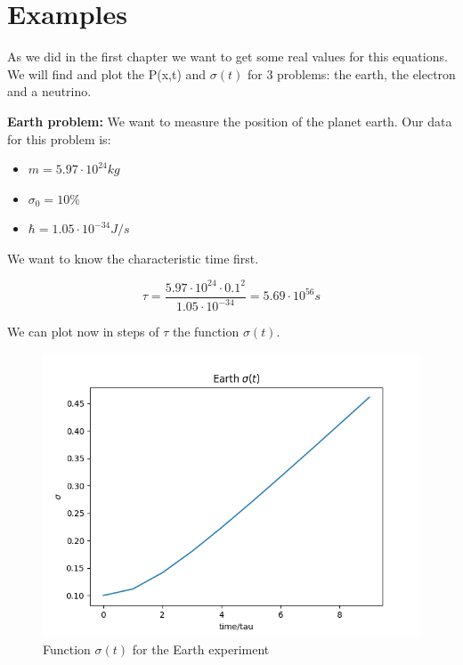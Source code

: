 \section{Examples}

As we did in the first chapter we want to get some real values for this equations. We will find and plot the P(x,t) and $\sigma(t)$ for 3 problems: the earth, the electron and a neutrino.

\textbf{Earth problem: } We want to measure the position of the planet earth. Our data for this problem is:

\begin{itemize}
    \item $m = 5.97 \cdot 10^{24} kg$
    \item $ \sigma_0 = 10\% $
    \item $\hbar = 1.05 \cdot 10^{-34} J/s$
\end{itemize}

We want to know the characteristic time first.

\begin{equation}
    \label{2.39}
    \tau = \frac{5.97\cdot 10^{24}\cdot 0.1^2}{1.05 \cdot 10^{-34}} = 5.69 \cdot 10^{56} s 
\end{equation}

We can plot now in steps of $\tau$ the function $\sigma(t)$.

\begin{figure}[H]
    \centering
    \includegraphics{images2/Earth/sigma.png}
    \caption{Function $\sigma(t)$ for the Earth experiment}
    \label{fig:sigma_earth}
\end{figure}

